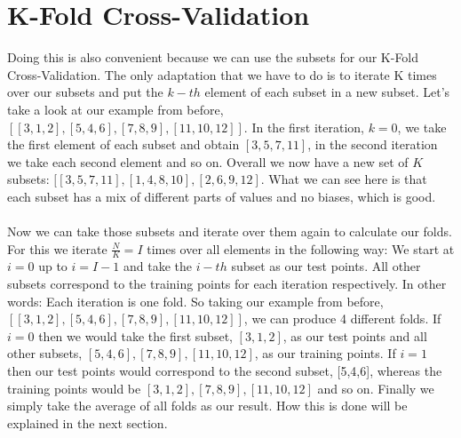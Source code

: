 \documentclass{article}
\begin{document}
\section{K-Fold Cross-Validation}
\label{sec:K-FoldCrossValidation}

Doing this is also convenient because we can use the subsets for our K-Fold Cross-Validation. The only adaptation that we have to do is to iterate K times over our subsets and put the $k-th$ element of each subset in a new subset. Let's take a look at our example from before, $[[3,1,2],[5,4,6],[7,8,9],[11,10,12]]$. In the first iteration, $k=0$, we take the first element of each subset and obtain $[3,5,7,11]$, in the second iteration we take each second element and so on. Overall we now have a new set of $K$ subsets: $[[3,5,7,11],[1,4,8,10],[2,6,9,12]$. What we can see here is that each subset has a mix of different parts of values and no biases, which is good. \\
\\
Now we can take those subsets and iterate over them again to calculate our folds. For this we iterate $\frac{N}{K} = I$ times over all elements in the following way: We start at $i = 0$ up to $i = I-1$ and take the $i-th$ subset as our test points. All other subsets correspond to the training points for each iteration respectively. In other words: Each iteration is one fold. So taking our example from before, $[[3,1,2],[5,4,6],[7,8,9],[11,10,12]]$, we can produce 4 different folds. If $i = 0$ then we would take the first subset, $[3,1,2]$, as our test points and all other subsets, $[5,4,6],[7,8,9],[11,10,12]$, as our training points. If $i = 1$ then our test points would correspond to the second subset, [5,4,6], whereas the training points would be $[3,1,2],[7,8,9],[11,10,12]$ and so on. Finally we simply take the average of all folds as our result. How this is done will be explained in the next section. 
\end{document}
